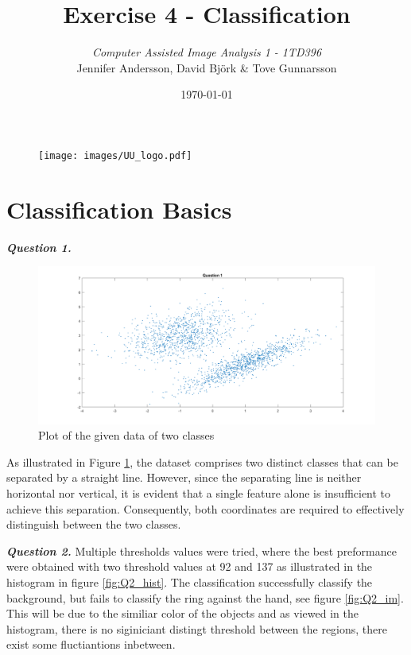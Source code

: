 \documentclass[12pt]{article}
\title{Exercise 4  - Classification}
\author{\textit{Computer Assisted Image Analysis 1  - 1TD396}  \vspace{1cm} \\
         Jennifer Andersson, David Björk \& Tove Gunnarsson \vspace{0.7cm}\\
        }
\date{\today}
\begin{document}
\maketitle

\begin{figure}[b]
  \centering
  \texttt{[image: images/UU\_logo.pdf]}
\end{figure}
\thispagestyle{empty}

\clearpage

\newpage
\section{Classification Basics}


\textbf{\emph{Question 1.}}

\begin{figure}[b]
  \centering
  \includegraphics[width = 15cm]{images/Q1.png}
  \caption{Plot of the given data of two classes}
  \label{fig:Q1}
\end{figure}

As illustrated in Figure \ref{fig:Q1}, the dataset comprises two distinct classes that can be separated by a straight line. However, since the separating line is neither horizontal nor vertical, it is evident that a single feature alone is insufficient to achieve this separation. Consequently, both coordinates are required to effectively distinguish between the two classes.

\textbf{\emph{Question 2.}}
Multiple thresholds values were tried, where the best preformance were obtained with two threshold values at 92 and 137 as illustrated in the histogram in figure \ref{fig:Q2_hist}. The classification successfully classify the background, but fails to classify the ring against the hand, see figure \ref{fig:Q2_im}. This will be due to the similiar color of the objects and as viewed in the histogram,  there is no siginiciant distingt threshold between the regions, there exist some fluctiantions inbetween. 
\end{document}
